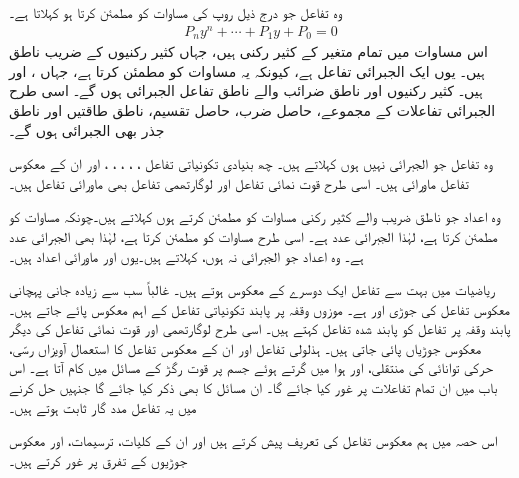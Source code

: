
وہ تفاعل  جو درج ذیل روپ کی مساوات کو    مطمئن کرتا ہو  کہلاتا ہے۔
\begin{align*}
P_ny^n+\cdots+P_1y+P_0=0
\end{align*}
اس مساوات میں تمام  متغیر  کے کثیر رکنی ہیں،  جہاں کثیر رکنیوں کے  ضریب  ناطق ہیں۔
یوں  ایک الجبرائی تفاعل ہے، کیونکہ یہ مساوات  کو مطمئن کرتا ہے، جہاں ،  اور  ہیں۔ کثیر رکنیوں اور ناطق ضرائب  والے ناطق تفاعل الجبرائی ہوں گے۔ اسی طرح الجبرائی تفاعلات کے مجموعے، حاصل ضرب، حاصل تقسیم، ناطق طاقتیں اور ناطق جذر بھی الجبرائی ہوں گے۔

وہ تفاعل جو الجبرائی نہیں ہوں  کہلاتے ہیں۔ چھ بنیادی تکونیاتی تفاعل ، ، ، ، ،  اور ان کے  معکوس  تفاعل ماورائی ہیں۔ اسی طرح قوت نمائی تفاعل     اور لوگارتھمی تفاعل بھی ماورائی تفاعل ہیں۔

وہ اعداد جو ناطق  ضریب  والے کثیر رکنی مساوات کو مطمئن کرتے ہوں  کہلاتے ہیں۔چونکہ  مساوات  کو مطمئن کرتا ہے، لہٰذا  الجبرائی عدد ہے۔ اسی طرح     مساوات  کو مطمئن کرتا ہے، لہٰذا  بھی الجبرائی عدد ہے۔ وہ اعداد جو الجبرائی نہ ہوں،  کہلاتے ہیں۔یوں   اور  ماورائی اعداد ہیں۔

  ریاضیات میں بہت سے تفاعل ایک دوسرے کے معکوس ہوتے  ہیں۔ غالباً سب سے زیادہ جانی پہچانی   معکوس تفاعل کی جوڑی  اور  ہے۔ موزوں وقفہ پر پابند تکونیاتی تفاعل کے اہم معکوس پائے  جاتے ہیں۔ پابند وقفہ پر تفاعل کو پابند شدہ تفاعل کہتے ہیں۔ اسی طرح  لوگارتھمی اور قوت نمائی تفاعل کی  دیگر معکوس جوڑیاں پائی جاتی ہیں۔ ہذلولی تفاعل اور ان کے معکوس تفاعل کا استعمال آویزاں رسّی،  حرکی توانائی کی منتقلی، اور ہوا میں گرتے ہوئے جسم پر قوت رگڑ کے مسائل میں کام آتا ہے۔ اس باب میں ان تمام تفاعلات  پر غور کیا جائے گا۔ ان مسائل  کا بھی ذکر کیا جائے گا جنہیں  حل کرنے میں یہ تفاعل   مدد گار ثابت ہوتے ہیں۔

اس حصہ میں ہم معکوس تفاعل کی تعریف پیش کرتے ہیں اور ان کے کلیات، ترسیمات، اور معکوس جوڑیوں کے تفرق پر غور کرتے ہیں۔

